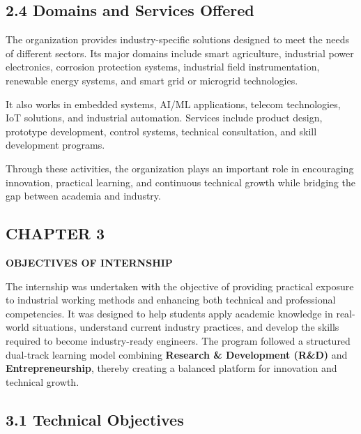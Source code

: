 \documentclass[10pt]{article}
\begin{document}
\subsection*{2.4 Domains and Services Offered}

\noindent
The organization provides industry-specific solutions designed to meet the needs of different sectors. Its major domains include smart agriculture, industrial power electronics, corrosion protection systems, industrial field instrumentation, renewable energy systems, and smart grid or microgrid technologies.

\noindent
It also works in embedded systems, AI/ML applications, telecom technologies, IoT solutions, and industrial automation. Services include product design, prototype development, control systems, technical consultation, and skill development programs.

\noindent
Through these activities, the organization plays an important role in encouraging innovation, practical learning, and continuous technical growth while bridging the gap between academia and industry.
\newpage
{}
\begin{flushleft}
{\fontsize{16pt}{16pt}\selectfont
\section*{CHAPTER 3}}
\end{flushleft}

\begin{center}
{\fontsize{18pt}{18pt}\selectfont \textbf{OBJECTIVES OF INTERNSHIP}}
\end{center}

\onehalfspacing
\fontsize{12pt}{14pt}\selectfont
\setlength{\parskip}{4pt}

\noindent
The internship was undertaken with the objective of providing practical exposure to industrial working methods and enhancing both technical and professional competencies. It was designed to help students apply academic knowledge in real-world situations, understand current industry practices, and develop the skills required to become industry-ready engineers. The program followed a structured dual-track learning model combining \textbf{Research \& Development (R\&D)} and \textbf{Entrepreneurship}, thereby creating a balanced platform for innovation and technical growth.

\subsection*{3.1 Technical Objectives}
\end{document}
